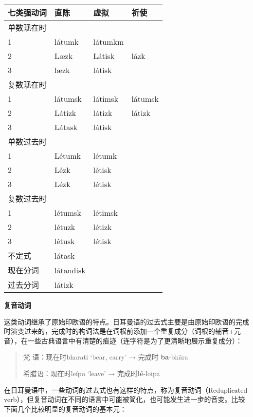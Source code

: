 \begin{longtable}{llll}
  \toprule
  七类强动词 & 直陈        & 虚拟      & 祈使      \\
  \midrule
  \endhead
  \bottomrule
  \endfoot
  单数现在时 &           &         &         \\
  1     & látumk    & látumkm &         \\
  2     & Læzk      & Látisk  & lázk    \\
  3     & læzk      & látisk  &         \\
  复数现在时 &           &         &         \\
  1     & látumsk   & látimsk & látumsk \\
  2     & Látizk    & látizk  & látizk  \\
  3     & Látask    & látisk  &         \\
  单数过去时 &           &         &         \\
  1     & Létumk    & létumk  &         \\
  2     & Lézk      & létisk  &         \\
  3     & Lézk      & létisk  &         \\
  复数过去时 &           &         &         \\
  1     & létumsk   & létimsk &         \\
  2     & létuzk    & létizk  &         \\
  3     & létusk    & létisk  &         \\
  不定式   & látask    &         &         \\
  现在分词  & látandisk &         &         \\
  过去分词  & látizk    &         &         \\
\end{longtable}

\textbf{复音动词}

这类动词继承了原始印欧语的特点。日耳曼语的过去式主要是由原始印欧语的完成时演变过来的，完成时的构词法是在词根前添加一个重复成分（词根的辅音+元音），在一些古典语言中有清楚的痕迹（连字符是为了更清晰地展示重复成分）：

\begin{quote}
  梵 语：现在时bharati `bear, carry' → 完成时 \textbf{ba}-bhāra

  希腊语：现在时leípō `leave' → 完成时\textbf{lé}-loipā
\end{quote}

在日耳曼语中，一些动词的过去式也有这样的特点，称为复音动词（Reduplicated
verb），但复音动词在不同的语言中可能被简化，也可能发生进一步的音变。比较下面几个比较明显的复音动词的基本元：

